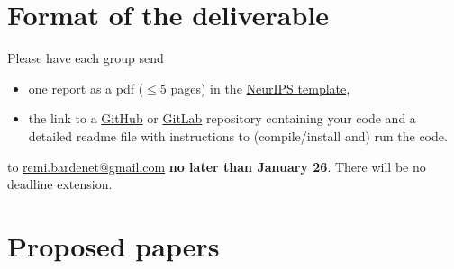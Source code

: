 \documentclass[12pt]{article}%
\begin{document}
\section{Format of the deliverable}
Please have each group send
\begin{itemize}
\item one report as a pdf ($\leq 5$ pages) in the \href{https://www.overleaf.com/latex/templates/neurips-2020/mnshsmqkjsqz}{NeurIPS template},
\item the link to a \href{https://github.com/}{GitHub} or  \href{https://about.gitlab.com/}{GitLab} repository containing your code and a detailed readme file with
  instructions to (compile/install and) run the code.
\end{itemize} to \href{mailto:remi.bardenet@gmail.com}{remi.bardenet@gmail.com} {\bf no later than January 26}. There will be no deadline extension.

\section{Proposed papers}
\label{s:papers}



\end{document}
